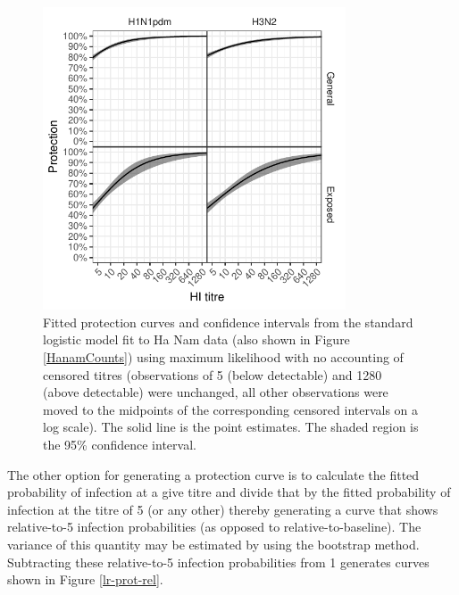 \documentclass[12pt]{article}
\begin{document}
\begin{figure}[htp]
	\centering
	\includegraphics[width=0.8\textwidth]{../fit-logistic-plot/hanam-hi-prot.pdf}
	\caption{
	Fitted protection curves and confidence intervals from the standard logistic model fit to Ha Nam data (also shown in Figure \ref{HanamCounts}) using maximum likelihood with no accounting of censored titres (observations of 5 (below detectable) and 1280 (above detectable) were unchanged, all other observations were moved to the midpoints of the corresponding censored intervals on a log scale). The solid line is the point estimates. The shaded region is the 95\% confidence interval.
	}
	\label{lr-prot-abs}
\end{figure}

The other option for generating a protection curve is to calculate the fitted probability of infection at a give titre and divide that by the fitted probability of infection at the titre of 5 (or any other) thereby generating a curve that shows relative-to-5 infection probabilities (as opposed to relative-to-baseline). The variance of this quantity may be estimated by using the bootstrap method. Subtracting these relative-to-5 infection probabilities from 1 generates curves shown in Figure \ref{lr-prot-rel}.

\pagebreak
\end{document}
